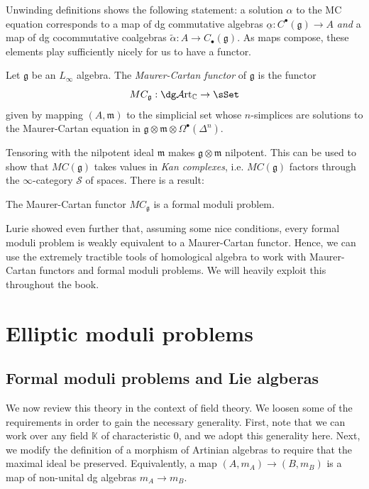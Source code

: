 Unwinding definitions shows the following statement: a solution $\alpha $ to the MC equation corresponds to a map of dg commutative algebras $\underline{\alpha } : C^{\bullet} (\mathfrak{g}) \to A$ \emph{and} a map of dg cocommutative coalgebras $\widetilde{\alpha } : A \to C_{\bullet} (\mathfrak{g} )$. As maps compose, these elements play sufficiently nicely for us to have a functor.
\begin{definition}\label{dfn:10-2-6}
	Let $\mathfrak{g} $ be an $L_\infty $ algebra. The \emph{Maurer-Cartan functor} of $\mathfrak{g} $ is the functor
	\[
		MC_{\mathfrak{g}}: \dg \mathcal{A} \mathrm{rt}_{\mathbb{C} }  \to \sSet 
	\]
	given by mapping $(A,\mathfrak{m} )$ to the simplicial set whose $n$-simplices are solutions to the Maurer-Cartan equation in $\mathfrak{g} \otimes \mathfrak{m} \otimes \Omega ^{\bullet} (\Delta ^n)$.
\end{definition}

Tensoring with the nilpotent ideal $\mathfrak{m} $ makes $\mathfrak{g}\otimes \mathfrak{m} $ nilpotent. This can be used to show that $MC(\mathfrak{g} )$ takes values in \emph{Kan complexes}, i.e. $MC(\mathfrak{g} )$ factors through the $\infty $-category $\mathcal{S} $ of spaces. There is a result:

\begin{theorem}\label{thm:10-2-7}
	The Maurer-Cartan functor $MC_{\mathfrak{g} } $ is a formal moduli problem.
\end{theorem}

Lurie showed even further that, assuming some nice conditions, every formal moduli problem is weakly equivalent to a Maurer-Cartan functor. Hence, we can use the extremely tractible tools of homological algebra to work with Maurer-Cartan functors and formal moduli problems. We will heavily exploit this throughout the book.

\chapter{Elliptic moduli problems}

\section{Formal moduli problems and Lie algberas}

We now review this theory in the context of field theory. We loosen some of the requirements in order to gain the necessary generality. First, note that we can work over any field $\mathbb{K} $ of characteristic 0, and we adopt this generality here. Next, we modify the definition of a morphism of Artinian algebras to require that the maximal ideal be preserved. Equivalently, a map $(A,m_A) \to (B,m_B)$ is a map of non-unital dg algebras $m_A \to m_B$.

